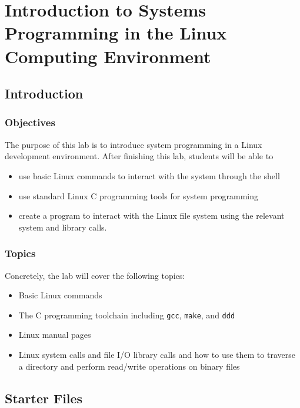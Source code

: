 \chapter{Introduction to Systems Programming in the Linux Computing Environment}
\section{Introduction}
\subsection{Objectives}
The purpose of this lab is to introduce system programming in a Linux development environment. After finishing this lab, students will be able to
\begin{itemize}
   \item use basic Linux commands to interact with the system through the shell
   \item use standard Linux C programming tools for system programming
   \item create a program to interact with the Linux file system using the relevant system and library calls.
\end{itemize}

\subsection{Topics}
Concretely, the lab will cover the following topics:
\begin{itemize}
  \item Basic Linux commands
  \item The C programming toolchain including \verb+gcc+, \verb+make+, and \verb+ddd+
  \item Linux manual pages
  \item Linux system calls and file I/O library calls and how to use them to traverse a directory and perform read/write operations on binary files
  \end{itemize}
  
\section{Starter Files}

